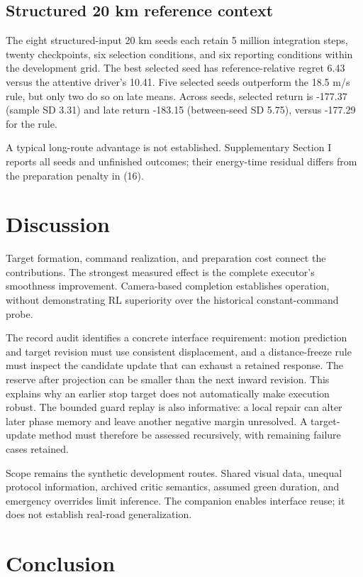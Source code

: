 \documentclass[letterpaper,journal]{IEEEtran}
\begin{document}
\subsection{Structured 20 km reference context}

The eight structured-input 20 km seeds each retain 5 million integration steps, twenty checkpoints, six selection conditions, and six reporting conditions within the development grid. The best selected seed has reference-relative regret 6.43 versus the attentive driver's 10.41. Five selected seeds outperform the 18.5 m/s rule, but only two do so on late means. Across seeds, selected return is -177.37 (sample SD 3.31) and late return -183.15 (between-seed SD 5.75), versus -177.29 for the rule.

A typical long-route advantage is not established. Supplementary Section I reports all seeds and unfinished outcomes; their energy-time residual differs from the preparation penalty in (16).

\section{Discussion}

Target formation, command realization, and preparation cost connect the contributions. The strongest measured effect is the complete executor's smoothness improvement. Camera-based completion establishes operation, without demonstrating RL superiority over the historical constant-command probe.

The record audit identifies a concrete interface requirement: motion prediction and target revision must use consistent displacement, and a distance-freeze rule must inspect the candidate update that can exhaust a retained response. The reserve after projection can be smaller than the next inward revision. This explains why an earlier stop target does not automatically make execution robust. The bounded guard replay is also informative: a local repair can alter later phase memory and leave another negative margin unresolved. A target-update method must therefore be assessed recursively, with remaining failure cases retained.

Scope remains the synthetic development routes. Shared visual data, unequal protocol information, archived critic semantics, assumed green duration, and emergency overrides limit inference. The companion enables interface reuse; it does not establish real-road generalization.

\section{Conclusion}
\end{document}
